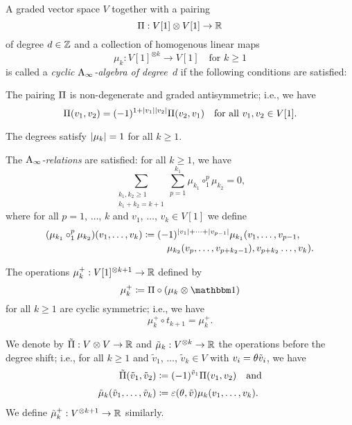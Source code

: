 \documentclass[\MainFolder/Text.tex]{subfiles}
\begin{document}
\begin{Def} \label{Def:CyclicAinfty}
A graded vector space $V$ together with a pairing 
$$ \Pi: V[1]\otimes V[1] \rightarrow \mathbb{R} $$
of degree $d\in \mathbb{Z}$ and a collection of homogenous linear maps 
$$\mu_k: V[1]^{\otimes k} \rightarrow V[1]\quad\text{for }k\ge 1$$
is called a \emph{cyclic $\mathrm{A}_\infty$-algebra of degree~$d$} if the following conditions are satisfied:
\begin{PlainList}
 \item The pairing $\Pi$ is non-degenerate and graded antisymmetric; i.e., we have
  $$ \Pi(v_1,v_2) = (-1)^{1+|v_1||v_2|} \Pi(v_2,v_1) \quad\text{for all }v_1, v_2 \in V[1]. $$
 \item The degrees satisfy $|\mu_k|=1$ for all $k\ge 1$.
 \item The \emph{$\mathrm{A}_\infty$-relations} are satisfied: for all $k\ge 1$, we have
\begin{equation} \label{Eq:AInftyDef}
 \sum_{\substack{k_1, k_2 \ge 1 \\ k_1+k_2 = k+1}} \sum_{p=1}^{k_1} \mu_{k_1} \circ_1^p \mu_{k_2} = 0,
 \end{equation}
where for all $p=1$, $\dotsc$, $k$ and $v_1$, $\dotsc$, $v_{k}\in V[1]$ we define
$$(\mu_{k_1} \circ_1^p \mu_{k_2})(v_1, \dotsc, v_{k}) \coloneqq \begin{multlined}[t] (-1)^{\Abs{v_1} + \dotsb + \Abs{v_{p-1}}} \mu_{k_1}(v_1, \dotsc, v_{p-1},\\ \mu_{k_2}(v_p,\dotsc,v_{p+k_2-1}),v_{p+k_2}\dotsc,v_{k}). \end{multlined}$$

 \item The operations $\mu_k^+: V[1]^{\otimes k+1} \rightarrow \mathbb{R}$ defined by 
 $$ \mu_k^+\coloneqq \Pair\circ (\mu_k \otimes \Id) $$
 for all $k\ge 1$ are cyclic symmetric; i.e., we have
 $$ \mu_k^+ \circ t_{k+1} = \mu_k^+. $$
\end{PlainList}
We denote by $\tilde{\Pi}: V\otimes V \rightarrow \mathbb{R}$ and $\tilde{\mu}_k: V^{\otimes k} \rightarrow \mathbb{R}$ the operations before the degree shift; i.e., for all $k\ge 1$ and $\tilde{v}_1$, $\dotsc$, $\tilde{v}_k \in V$ with $v_i = \theta \tilde{v}_i$, we have
$$\begin{aligned}
\tilde{\Pi}(\tilde{v}_1, \tilde{v}_2) &\coloneqq (-1)^{\tilde{v}_1} \Pi(v_1, v_2)\quad\text{and} \\[\jot]
\tilde{\mu}_k(\tilde{v}_1, \dotsc, \tilde{v}_k) &\coloneqq \varepsilon(\theta,\tilde{v}) \mu_k(v_1,\dotsc, v_k).
\end{aligned} $$
We define $\tilde{\mu}_k^+: V^{\otimes k+1}\rightarrow \mathbb{R}$ similarly.


\end{Def}
\end{document}
